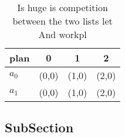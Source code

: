 \documentclass[a4paper]{article}
\begin{document}
\begin{table}
\begin{adjustbox}{width=0.5\columnwidth}
\begin{tabular}{|l|l|l|l|}
\hline
\textbf{plan} & \multicolumn{1}{c|}{\textbf{0}} & \multicolumn{1}{c|}{\textbf{1}} & \multicolumn{1}{c|}{\textbf{2}} \\ \hline
\textbf{$a_0$}  & (0,0) & (1,0) & (2,0) \\ \hline
\textbf{$a_1$}  & (0,0) & (1,0) & (2,0) \\ \hline
\end{tabular}
\end{adjustbox}
\caption{Is huge is competition between the two lists let And workpl
}
\end{table}

\subsection{SubSection}
\end{document}
